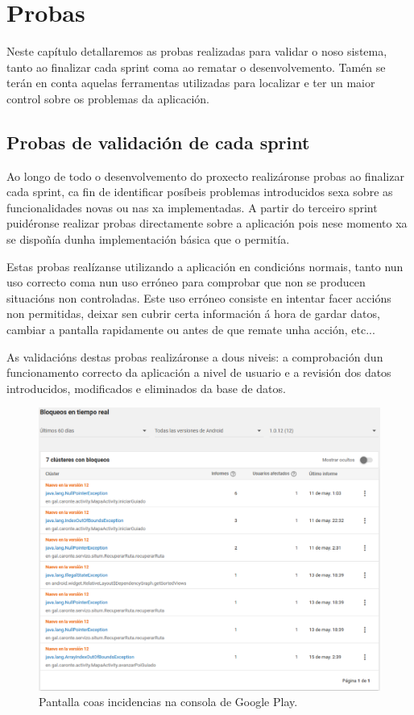 \chapter{Probas}

Neste capítulo detallaremos as probas realizadas para validar o noso sistema, tanto ao finalizar cada sprint coma ao rematar o desenvolvemento. Tamén se terán en conta aquelas ferramentas utilizadas para localizar e ter un maior control sobre os problemas da aplicación.

\section{Probas de validación de cada sprint}
Ao longo de todo o desenvolvemento do proxecto realizáronse probas ao finalizar cada sprint, ca fin de identificar posíbeis problemas introducidos sexa sobre as funcionalidades novas ou nas xa implementadas. A partir do terceiro sprint puidéronse realizar probas directamente sobre a aplicación pois nese momento xa se dispoñía dunha implementación básica que o permitía.

Estas probas realízanse utilizando a aplicación en condicións normais, tanto nun uso correcto coma nun uso erróneo para comprobar que non se producen situacións non controladas. Este uso erróneo consiste en intentar facer accións non permitidas, deixar sen cubrir certa información á hora de gardar datos, cambiar a pantalla rapidamente ou antes de que remate unha acción, etc...

As validacións destas probas realizáronse a dous niveis: a comprobación dun funcionamento correcto da aplicación a nivel de usuario e a revisión dos datos introducidos, modificados e eliminados da base de datos.

\begin{figure}[h]
	\begin{center}
		\includegraphics[width=1\textwidth]{figures/capturas/consolaGoogleBloqueos}
		\caption{Pantalla coas incidencias na consola de Google Play.}
		\label{fig:consolaGoogleBloqueos}
	\end{center}
\end{figure}


